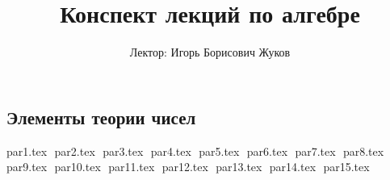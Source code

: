\documentclass[12pt, letterpaper]{report}
\title{Конспект лекций по алгебре}
\author{Лектор: Игорь Борисович Жуков}
\date{}
\theoremstyle{definition}
\begin{document}
\maketitle

\newpage
\pagestyle{plain}

\tableofcontents

\newpage
\begin{normalsize}

\chapter*{Элементы теории чисел}

{par1.tex}
$ $
{par2.tex}
$ $
{par3.tex}
$ $
{par4.tex}
$ $
{par5.tex}
$ $
{par6.tex}
$ $
{par7.tex}
$ $
{par8.tex}
$ $
{par9.tex}
$ $
{par10.tex}
$ $
{par11.tex}
$ $
{par12.tex}
$ $
{par13.tex}
$ $
{par14.tex}
$ $
{par15.tex}
$ $

\end{normalsize}
\end{document}

